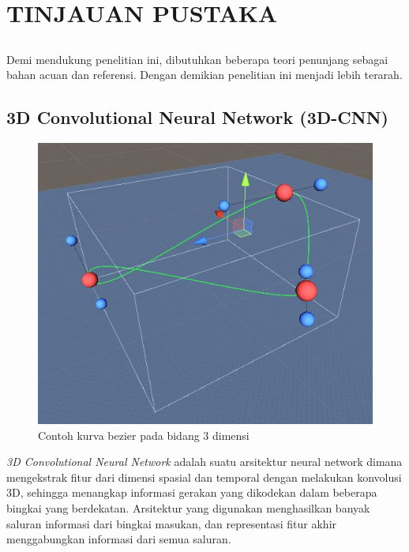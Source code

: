 \chapter{TINJAUAN PUSTAKA}
\vspace{1ex}

\section*{}
Demi mendukung penelitian ini, dibutuhkan beberapa teori penunjang sebagai bahan acuan dan referensi. Dengan demikian penelitian ini menjadi lebih terarah. 
\vspace{1ex}

\section{3D Convolutional Neural Network (3D-CNN)}
\vspace{1ex}

\begin{figure} [!htb]
	\captionsetup{justification=centering}
	\includegraphics[scale=0.4]{img/contoh-kurva-bezier.JPG}
	\caption{Contoh kurva bezier pada bidang 3 dimensi}
	\label{fig:2.1}
\end{figure}

\textit{3D Convolutional Neural Network} adalah suatu arsitektur neural network dimana mengekstrak fitur dari dimensi spasial dan temporal dengan melakukan konvolusi 3D, sehingga menangkap informasi gerakan yang dikodekan dalam beberapa bingkai yang berdekatan. Arsitektur yang digunakan menghasilkan banyak saluran informasi dari bingkai masukan, dan representasi fitur akhir menggabungkan informasi dari semua saluran.
\vspace{1ex}

